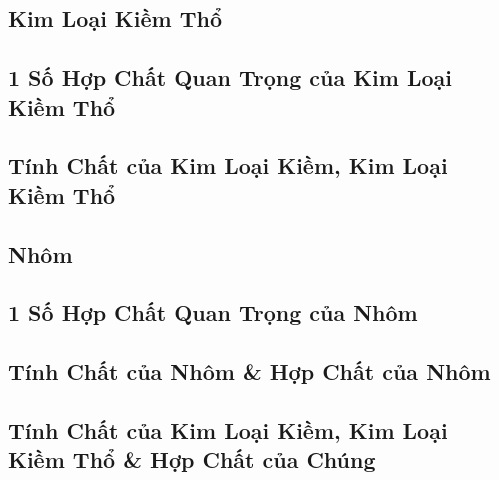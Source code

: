 \documentclass{article}
\numberwithin{equation}{section}
\begin{document}
\subsection{Kim Loại Kiềm Thổ}


\subsection{1 Số Hợp Chất Quan Trọng của Kim Loại Kiềm Thổ}


\subsection{Tính Chất của Kim Loại Kiềm, Kim Loại Kiềm Thổ}


\subsection{Nhôm}


\subsection{1 Số Hợp Chất Quan Trọng của Nhôm}


\subsection{Tính Chất của Nhôm \& Hợp Chất của Nhôm}


\subsection{Tính Chất của Kim Loại Kiềm, Kim Loại Kiềm Thổ \& Hợp Chất của Chúng}

\end{document}
